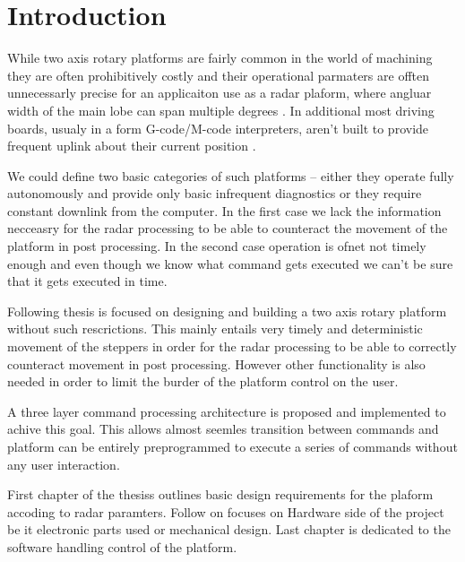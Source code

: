 
\chapter*{Introduction}

While two axis rotary platforms are fairly common in the world of machining they are often prohibitively costly and their operational parmaters are offten unnecessarly precise \cite{carl} for an applicaiton use as a radar plaform, where angluar width of the main lobe can span multiple degrees \cite{sidarMAN}.
In additional most driving boards, usualy in a form G-code/M-code interpreters, aren't built to provide frequent uplink about their current position \cite{duet}.


We could define two basic categories of such platforms -- either they operate fully autonomously and provide only basic infrequent diagnostics or they require constant downlink from the computer.
In the first case we lack the information necceasry for the radar processing to be able to counteract the movement of the platform in post processing.
In the second case operation is ofnet not timely enough and even though we know what command gets executed we can't be sure that it gets executed in time.

Following thesis is focused on designing and building a two axis rotary platform without such rescrictions.
This mainly entails very timely and deterministic movement of the steppers in order for the radar processing to be able to correctly counteract movement in post processing.
However other functionality is also needed in order to limit the burder of the platform control on the user.

A three layer command processing architecture is proposed and implemented to achive this goal.
This allows almost seemles transition between commands and platform can be entirely preprogrammed to execute a series of commands without any user interaction.

First chapter of the thesiss outlines basic design requirements for the plaform accoding to radar paramters.
Follow on focuses on Hardware side of the project be it electronic parts used or mechanical design.
Last chapter is dedicated to the software handling control of the platform.
